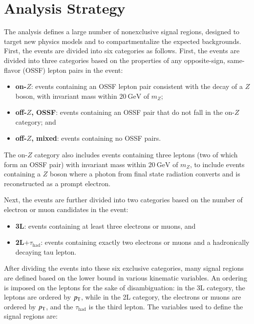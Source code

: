 \section{Analysis Strategy}\label{sec:model-independent-analysis-strategy}
The analysis defines a large number of nonexclusive signal regions, designed to target new physics models and to compartmentalize the expected backgrounds. First, the events are divided into six categories as follows. First, the events are divided into three categories based on the properties of any opposite-sign, same-flavor (OSSF) lepton pairs in the event:

\begin{itemize}
	\item \textbf{on-$Z$}: events containing an OSSF lepton pair consistent with the decay of a $Z$ boson, with invariant mass within $\SI{20}{\giga\electronvolt}$ of $m_Z$;
	\item \textbf{off-$Z$, OSSF}:  events containing an OSSF pair that do not fall in the on-$Z$ category; and
	\item \textbf{off-$Z$, mixed}: events containing no OSSF pairs.
\end{itemize}

The on-$Z$ category also includes events containing three leptons (two of which form an OSSF pair) with invariant mass within $\SI{20}{\giga\electronvolt}$ of $m_Z$, to include events containing a $Z$ boson where a photon from final state radiation converts and is reconstructed as a prompt electron.

Next, the events are further divided into two categories based on the number of electron or muon candidates in the event:

\begin{itemize}
	\item \textbf{3L}: events containing at least three electrons or muons, and
	\item \textbf{2L$+\tau_{\mathrm{had}}$}: events containing exactly two electrons or muons and a hadronically decaying tau lepton.
\end{itemize}

After dividing the events into these six exclusive categories, many signal regions are defined based on the lower bound in various kinematic variables. An ordering is imposed on the leptons for the sake of disambiguation: in the 3L category, the leptons are ordered by $p_{\text{T}}$, while in the 2L category, the electrons or muons are ordered by $p_{\text{T}}$, and the $\tau_{\mathrm{had}}$ is the third lepton.  The variables used to define the signal regions are:

